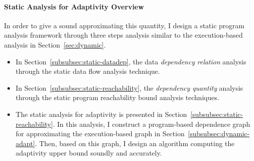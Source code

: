 \paragraph{{Static Analysis for Adaptivity} Overview}
In order to give a sound approximating this quantity, I design a static program analysis framework through three steps analysis
similar to the execution-based analysis in Section~\ref{sec:dynamic}.
\begin{itemize}
\item In Section~\ref{subsubsec:static-datadep},
the data \emph{dependency relation} analysis through the static data flow analysis technique.
\item In Section~\ref{subsubsec:static-reachability}, the \emph{dependency quantity} analysis through the static program reachability bound analysis techniques.
\item The static analysis for adaptivity is presented in Section~\ref{subsubsec:static-reachability}.
In this analysis, I construct a program-based dependence graph for approximating the execution-based graph in Section~\ref{subsubsec:dynamic-adapt}.
Then, based on this graph, I design an algorithm
computing the adaptivity upper bound soundly 
and accurately.
\end{itemize}